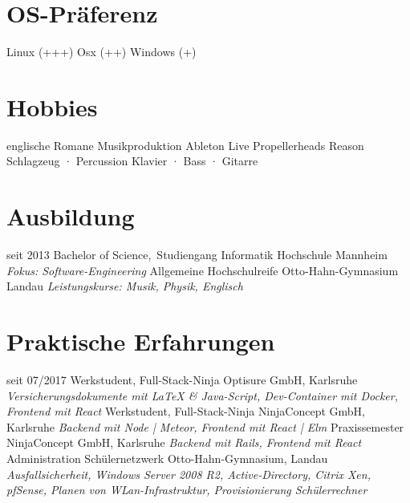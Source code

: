 \documentclass[]{friggeri-cv}
\begin{document}
\begin{aside}
  \section{OS-Präferenz}
  Linux {\footnotesize{(+++)}}
  Osx {\footnotesize{(++)}}
  Windows {\footnotesize{(+)}}
  \section{Hobbies}
    englische Romane
    Musikproduktion
    {\footnotesize Ableton Live
    Propellerheads Reason
    Schlagzeug · Percussion
    Klavier · Bass · Gitarre}
\end{aside}

\section{Ausbildung}

\begin{entrylist}
  \entry
    {seit 2013}
    {Bachelor of Science{\normalfont ,~Studiengang Informatik}}
    {Hochschule Mannheim}
    {\emph{Fokus: Software-Engineering}}
  \entry
    {}
    {Allgemeine Hochschulreife {\normalfont }}
    {Otto-Hahn-Gymnasium Landau}
    {\emph{Leistungskurse: Musik, Physik, Englisch}}
\end{entrylist}

\section{Praktische Erfahrungen}

\begin{entrylist}
  \entry
    {seit 07/2017}
    {Werkstudent, Full-Stack-Ninja}
    {Optisure GmbH, Karlsruhe}
    {\emph{Versicherungsdokumente mit \LaTeX{} \& Java-Script, Dev-Container mit Docker, Frontend mit React}}
  \entry
    {}
    {Werkstudent, Full-Stack-Ninja}
    {NinjaConcept GmbH, Karlsruhe}
    {\emph{Backend mit Node | Meteor, Frontend mit React | Elm}}
  \entry
    {}
    {Praxissemester}
    {NinjaConcept GmbH, Karlsruhe}
    {\emph{Backend mit Rails, Frontend mit React}}
  \entry
    {}
    {Administration Schülernetzwerk}
    {Otto-Hahn-Gymnasium, Landau}
    {\emph{Ausfallsicherheit, Windows Server 2008 R2, Active-Directory, Citrix Xen, pfSense, Planen von WLan-Infrastruktur, Provisionierung Schülerrechner}}
\end{entrylist}
\end{document}
